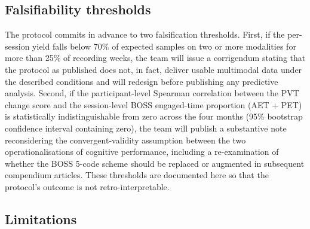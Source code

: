 \subsection{Falsifiability thresholds}\label{subsec:falsifiability}

The protocol commits in advance to two falsification thresholds. First, if the per-session yield falls below 70\% of expected samples on two or more modalities for more than 25\% of recording weeks, the team will issue a corrigendum stating that the protocol as published does not, in fact, deliver usable multimodal data under the described conditions and will redesign before publishing any predictive analysis. Second, if the participant-level Spearman correlation between the PVT change score and the session-level BOSS engaged-time proportion (AET + PET) is statistically indistinguishable from zero across the four months (95\% bootstrap confidence interval containing zero), the team will publish a substantive note reconsidering the convergent-validity assumption between the two operationalisations of cognitive performance, including a re-examination of whether the BOSS 5-code scheme should be replaced or augmented in subsequent compendium articles. These thresholds are documented here so that the protocol's outcome is not retro-interpretable.

\subsection{Limitations}\label{subsec:limitations}

